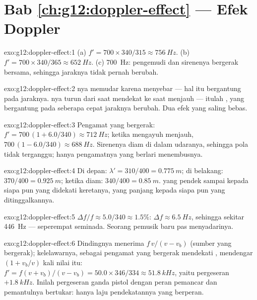 \section*{Bab \ref{ch:g12:doppler-effect} --- Efek Doppler}

\begin{solution}{exo:g12:doppler-effect:1}
(a) $f' = 700 \times 340/315 \approx \qty{756}{Hz}$.
(b) $f' = 700 \times 340/365 \approx \qty{652}{Hz}$.
(c) \qty{700}{Hz}: pengemudi dan sirenenya bergerak bersama, sehingga jaraknya tidak
pernah berubah.
\end{solution}

\begin{solution}{exo:g12:doppler-effect:2}
\emph{}nya memudar karena  menyebar --- hal itu bergantung pada
jaraknya. \emph{}nya turun dari saat mendekat ke saat menjauh --- itulah , yang bergantung pada seberapa cepat jaraknya berubah. Dua efek yang saling bebas.
\end{solution}

\begin{solution}{exo:g12:doppler-effect:3}
Pengamat yang bergerak: $f' = 700\,(1 + 6.0/340) \approx \qty{712}{Hz}$; ketika mengayuh
menjauh, $700\,(1 - 6.0/340) \approx \qty{688}{Hz}$. Sirenenya diam di dalam udaranya,
sehingga pola  tidak terganggu; hanya pengamatnya yang berlari menembusnya.
\end{solution}

\begin{solution}{exo:g12:doppler-effect:4}
Di depan: $\lambda' = 310/400 = \qty{0.775}{m}$; di belakang:
$370/400 = \qty{0.925}{m}$; ketika diam: $340/400 = \qty{0.85}{m}$.  yang
pendek sampai kepada siapa pun yang didekati keretanya, yang panjang kepada siapa pun yang
ditinggalkannya.
\end{solution}

\begin{solution}{exo:g12:doppler-effect:5}
$\Delta f/f \approx 5.0/340 \approx 1.5\%$: $\Delta f \approx \qty{6.5}{Hz}$, sehingga
sekitar \qty{446}{Hz} --- seperempat seminada. Seorang pemusik baru pas menyadarinya.
\end{solution}

\begin{solution}{exo:g12:doppler-effect:6}
Dindingnya menerima $f\,v/(v - v_b)$ (sumber yang bergerak); kelelawarnya, sebagai pengamat
yang bergerak mendekati , mendengar $(1 + v_b/v)$ kali nilai itu:
$f' = f(v + v_b)/(v - v_b) = 50.0 \times
346/334 \approx \qty{51.8}{kHz}$, yaitu
pergeseran $+\qty{1.8}{kHz}$. Inilah pergeseran ganda pistol  dengan peran pemancar
dan pemantulnya bertukar: hanya laju pendekatannya yang berperan.
\end{solution}

